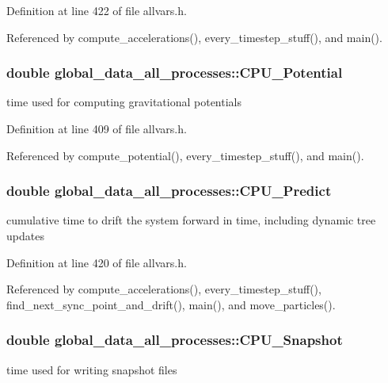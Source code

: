 Definition at line 422 of file allvars.h.



Referenced by compute\_\-accelerations(), every\_\-timestep\_\-stuff(), and main().

\hypertarget{structglobal__data__all__processes_ab5f1e056cdaa2562ec2bd3945f634d73}{
\subsubsection[{CPU\_\-Potential}]{\setlength{\rightskip}{0pt plus 5cm}double {\bf global\_\-data\_\-all\_\-processes::CPU\_\-Potential}}}
\label{structglobal__data__all__processes_ab5f1e056cdaa2562ec2bd3945f634d73}
time used for computing gravitational potentials 

Definition at line 409 of file allvars.h.



Referenced by compute\_\-potential(), every\_\-timestep\_\-stuff(), and main().

\hypertarget{structglobal__data__all__processes_afb9d30620ea0dc8b9e46000e3ce0b3e3}{
\subsubsection[{CPU\_\-Predict}]{\setlength{\rightskip}{0pt plus 5cm}double {\bf global\_\-data\_\-all\_\-processes::CPU\_\-Predict}}}
\label{structglobal__data__all__processes_afb9d30620ea0dc8b9e46000e3ce0b3e3}
cumulative time to drift the system forward in time, including dynamic tree updates 

Definition at line 420 of file allvars.h.



Referenced by compute\_\-accelerations(), every\_\-timestep\_\-stuff(), find\_\-next\_\-sync\_\-point\_\-and\_\-drift(), main(), and move\_\-particles().

\hypertarget{structglobal__data__all__processes_a4b533ec2fc1af7ee057eaa5805a65a7a}{
\subsubsection[{CPU\_\-Snapshot}]{\setlength{\rightskip}{0pt plus 5cm}double {\bf global\_\-data\_\-all\_\-processes::CPU\_\-Snapshot}}}
\label{structglobal__data__all__processes_a4b533ec2fc1af7ee057eaa5805a65a7a}
time used for writing snapshot files 

